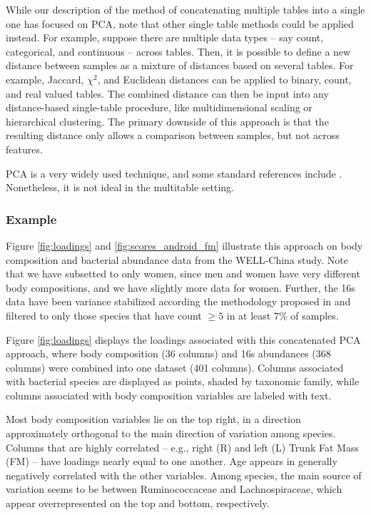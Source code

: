 \documentclass[14pt]{extarticle}
\begin{document}
While our description of the method of concatenating multiple tables into a
single one has focused on PCA, note that other single table methods could be
applied instead. For example, suppose there are multiple data types -- say
count, categorical, and continuous -- across tables. Then, it is possible to
define a new distance between samples as a mixture of distances based on several
tables. For example, Jaccard, $\chi^{2}$, and Euclidean distances can be applied
to binary, count, and real valued tables. The combined distance can then be
input into any distance-based single-table procedure, like multidimensional
scaling or hierarchical clustering. The primary downside of this approach is
that the resulting distance only allows a comparison between samples, but not
across features.

PCA is a very widely used technique, and some standard references include
\citep{friedman2001elements, mardia1980multivariate, pages2014multiple}.
Nonetheless, it is not ideal in the multitable setting.

\subsubsection{Example}
\label{subsubsec:pca_example}

Figure \ref{fig:loadings} and \ref{fig:scores_android_fm} illustrate this approach
on body composition and bacterial abundance data from the WELL-China study. Note
that we have subsetted to only women, since men and women have very different
body compositions, and we have slightly more data for women. Further, the 16s
data have been variance stabilized according the methodology proposed in
\citep{Anders2010} and filtered to only those species that have count $\geq 5$
in at least 7\% of samples.

Figure \ref{fig:loadings} displays the loadings associated with this
concatenated PCA approach, where body composition (36 columns) and 16s
abundances (368 columns) were combined into one dataset (401 columns). Columns
associated with bacterial species are displayed as points, shaded by taxonomic
family, while columns associated with body composition variables are labeled
with text.

Most body composition variables lie on the top right, in a direction
approximately orthogonal to the main direction of variation among species. Columns
that are highly correlated -- e.g., right (R) and left (L) Trunk Fat Mass (FM) --
have loadings nearly equal to one another. Age appears in generally negatively
correlated with the other variables. Among species, the main
source of variation seems to be between Ruminococcaceae and Lachnospiraceae,
which appear overrepresented on the top and bottom, respectively.
\end{document}
